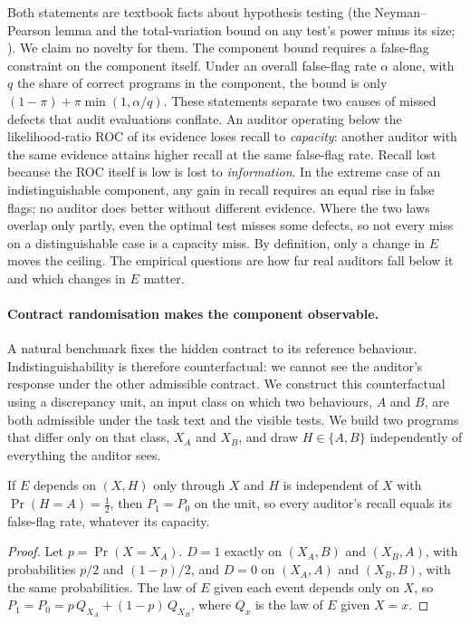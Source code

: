 Both statements are textbook facts about hypothesis testing (the Neyman--Pearson lemma and the total-variation
bound on any test's power minus its size; \citealp{neyman1933efficient}). We claim no novelty for them. The
component bound requires a false-flag constraint on the component itself. Under an overall false-flag rate $\alpha$
alone, with $q$ the share of correct programs in the component, the bound is only $(1-\pi)+\pi\min(1,\alpha/q)$.
These statements separate two causes of missed defects that audit evaluations conflate.
An auditor operating below the likelihood-ratio ROC of its evidence loses recall to \emph{capacity}: another
auditor with the same evidence attains higher recall at the same false-flag rate. Recall lost because the ROC itself
is low is lost to \emph{information}. In the extreme case of an indistinguishable component, any gain in recall requires
an equal rise in false flags; no auditor does better without different evidence. Where the two laws
overlap only partly, even the optimal test misses some defects, so not every miss on a distinguishable case is a
capacity miss. By definition, only a change in $E$ moves the ceiling. The empirical questions are how far real auditors fall
below it and which changes in $E$ matter.

\paragraph{Contract randomisation makes the component observable.}
A natural benchmark fixes the hidden contract to its reference behaviour. Indistinguishability is therefore
counterfactual: we cannot see the auditor's response under the other admissible contract. We construct this
counterfactual using a discrepancy unit, an input class on which two behaviours, $A$ and $B$, are both admissible
under the task text and the visible tests. We build two programs that differ only on that class, $X_A$ and $X_B$,
and draw $H\in\{A,B\}$ independently of everything the auditor sees.

\begin{lemma}
\label{lem:symmetric}
If $E$ depends on $(X,H)$ only through $X$ and $H$ is independent of $X$ with $\Pr(H=A)=\tfrac12$, then $P_1=P_0$ on
the unit, so every auditor's recall equals its false-flag rate, whatever its capacity.
\end{lemma}

\begin{proof}
Let $p=\Pr(X=X_A)$. $D=1$ exactly on $(X_A,B)$ and $(X_B,A)$, with probabilities $p/2$ and $(1-p)/2$, and $D=0$
on $(X_A,A)$ and $(X_B,B)$, with the same probabilities. The law of $E$ given each event depends only on $X$, so
$P_1=P_0=p\,Q_{X_A}+(1-p)\,Q_{X_B}$, where $Q_x$ is the law of $E$ given $X=x$.
\end{proof}

